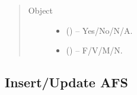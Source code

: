 \documentclass[letterpaper,10pt,english,openany,oneside]{sphinxmanual}
\begin{document}
\begin{fulllineitems}
\begin{sphinxVerbatim}[commandchars=\\\{\}]
           
           
           
    \PYG{p}{]}
\end{sphinxVerbatim}
\begin{quote}\begin{description}
\item[{Object}] \leavevmode\begin{itemize}
\item {} 
\sphinxAtStartPar
{} () – Yes/No/N/A.

\item {} 
\sphinxAtStartPar
{} () – F/V/M/N.

\end{itemize}

\end{description}\end{quote}

\end{fulllineitems}



\subsection{Insert/Update AFS}
\label{\detokenize{api-last-mile/v1:insert-update-afs}}
\end{document}
